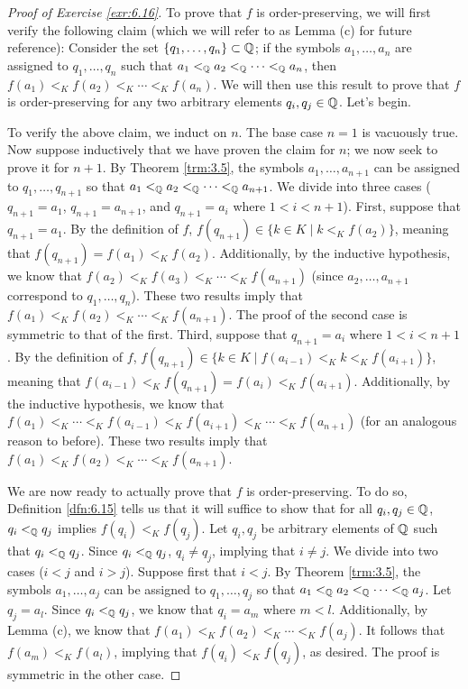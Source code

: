 \documentclass[../main.tex]{subfiles}
\begin{document}
\begin{exercise}
\begin{proof}[Proof of Exercise \ref{exr:6.16}]
        To prove that $f$ is order-preserving, we will first verify the following claim (which we will refer to as Lemma (c) for future reference): Consider the set $\{q_1,\dots,q_n\}\subset\mathbb{Q}$; if the symbols $a_1,\dots,a_n$ are assigned to $q_1,\dots,q_n$ such that $a_1<_{\mathbb{Q}} a_2<_{\mathbb{Q}} \cdots<_{\mathbb{Q}} a_n$, then $f(a_1)<_Kf(a_2)<_K\cdots<_Kf(a_n)$. We will then use this result to prove that $f$ is order-preserving for any two arbitrary elements $q_i,q_j\in\mathbb{Q}$. Let's begin.\par
        To verify the above claim, we induct on $n$. The base case $n=1$ is vacuously true. Now suppose inductively that we have proven the claim for $n$; we now seek to prove it for $n+1$. By Theorem \ref{trm:3.5}, the symbols $a_1,\dots,a_{n+1}$ can be assigned to $q_1,\dots,q_{n+1}$ so that $a_1<_{\mathbb{Q}} a_2<_{\mathbb{Q}} \cdots<_{\mathbb{Q}} a_{n+1}$. We divide into three cases ($q_{n+1}=a_1$, $q_{n+1}=a_{n+1}$, and $q_{n+1}=a_i$ where $1<i<n+1$). First, suppose that $q_{n+1}=a_1$. By the definition of $f$, $f(q_{n+1})\in\{k\in K\mid k<_Kf(a_2)\}$, meaning that $f(q_{n+1})=f(a_1)<_Kf(a_2)$. Additionally, by the inductive hypothesis, we know that $f(a_2)<_Kf(a_3)<_K\cdots<_Kf(a_{n+1})$ (since $a_2,\dots,a_{n+1}$ correspond to $q_1,\dots,q_n$). These two results imply that $f(a_1)<_Kf(a_2)<_K\cdots<_Kf(a_{n+1})$. The proof of the second case is symmetric to that of the first. Third, suppose that $q_{n+1}=a_i$ where $1<i<n+1$. By the definition of $f$, $f(q_{n+1})\in\{k\in K\mid f(a_{i-1})<_Kk<_Kf(a_{i+1})\}$, meaning that $f(a_{i-1})<_Kf(q_{n+1})=f(a_i)<_Kf(a_{i+1})$. Additionally, by the inductive hypothesis, we know that $f(a_1)<_K\cdots<_Kf(a_{i-1})<_Kf(a_{i+1})<_K\cdots<_Kf(a_{n+1})$ (for an analogous reason to before). These two results imply that $f(a_1)<_Kf(a_2)<_K\cdots<_Kf(a_{n+1})$.\par
        We are now ready to actually prove that $f$ is order-preserving. To do so, Definition \ref{dfn:6.15} tells us that it will suffice to show that for all $q_i,q_j\in\mathbb{Q}$, $q_i<_{\mathbb{Q}} q_j$ implies $f(q_i)<_Kf(q_j)$. Let $q_i,q_j$ be arbitrary elements of $\mathbb{Q}$ such that $q_i<_{\mathbb{Q}} q_j$. Since $q_i<_{\mathbb{Q}} q_j$, $q_i\neq q_j$, implying that $i\neq j$. We divide into two cases ($i<j$ and $i>j$). Suppose first that $i<j$. By Theorem \ref{trm:3.5}, the symbols $a_1,\dots,a_j$ can be assigned to $q_1,\dots,q_j$ so that $a_1<_{\mathbb{Q}} a_2<_{\mathbb{Q}} \cdots<_{\mathbb{Q}} a_j$. Let $q_j=a_l$. Since $q_i<_{\mathbb{Q}} q_j$, we know that $q_i=a_m$ where $m<l$. Additionally, by Lemma (c), we know that $f(a_1)<_Kf(a_2)<_K\cdots<_Kf(a_j)$. It follows that $f(a_m)<_Kf(a_l)$, implying that $f(q_i)<_Kf(q_j)$, as desired. The proof is symmetric in the other case.\par\smallskip

\end{proof}
\end{exercise}
\end{document}

